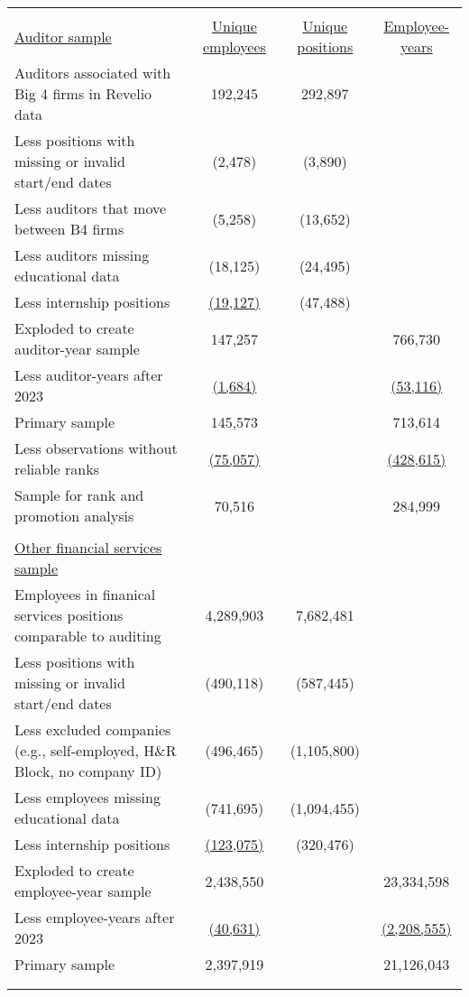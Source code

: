 \begin{tabular}{ l c c c}\\[-1.8ex]\hline \hline \\[-1.8ex]\underline{Auditor sample}& \underline{Unique employees} & \underline{Unique positions} & \underline{Employee-years} \\Auditors associated with Big 4 firms in Revelio data & 192,245 & 292,897 & \\ \quad Less positions with missing or invalid start/end dates &(2,478) & (3,890) & \\ \quad Less auditors that move between B4 firms &(5,258) & (13,652) & \\ \quad Less auditors missing educational data &(18,125) & (24,495) & \\ \quad Less internship positions &\underline{(19,127)} & (47,488) & \\ Exploded to create auditor-year sample &147,257 &  & 766,730\\ \quad Less auditor-years after 2023 &\underline{(1,684)} & & \underline{(53,116)}\\ Primary sample &145,573& &713,614\\ \quad Less observations without reliable ranks &\underline{(75,057)} & & \underline{(428,615)}\\ Sample for rank and promotion analysis &70,516 &  & 284,999\\\\ \underline{Other financial services sample} & & &\\Employees in finanical services positions comparable to auditing & 4,289,903 & 7,682,481 & \\ \quad Less positions with missing or invalid start/end dates &(490,118) & (587,445) & \\ \quad Less excluded companies (e.g., self-employed, H\&R Block, no company ID) &(496,465) & (1,105,800) & \\ \quad Less employees missing educational data &(741,695) & (1,094,455) & \\ \quad Less internship positions &\underline{(123,075)} & (320,476) & \\ Exploded to create employee-year sample &2,438,550 &  & 23,334,598\\ \quad Less employee-years after 2023 &\underline{(40,631)} & & \underline{(2,208,555)}\\ Primary sample &2,397,919& &21,126,043\\\\[-1.8ex]\hline \hline \\[-1.8ex]\end{tabular}